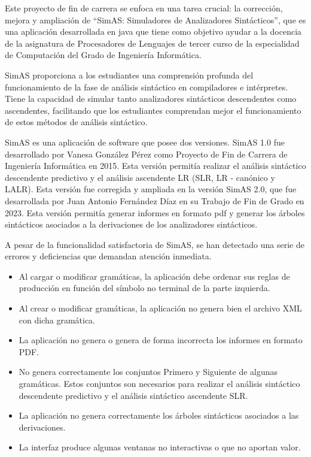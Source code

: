 Este proyecto de fin de carrera se enfoca en una tarea crucial: la corrección, mejora y ampliación de ``SimAS: Simuladores de Analizadores Sintácticos'', que es una aplicación desarrollada en java que tiene como objetivo ayudar a la docencia de la asignatura de Procesadores de Lenguajes de tercer curso de la especialidad de Computación del Grado de Ingeniería Informática. 

SimAS proporciona a los estudiantes una comprensión profunda del funcionamiento de la fase de análisis sintáctico en compiladores e intérpretes. Tiene la capacidad de simular tanto analizadores sintácticos descendentes como ascendentes, facilitando que los estudiantes comprendan mejor el funcionamiento de estos métodos de análisis sintáctico.

SimAS es una aplicación de software que posee dos versiones. SimAS 1.0 fue desarrollado por Vanesa González Pérez \cite{vanesa} como Proyecto de Fin de Carrera de Ingeniería Informática en 2015. Esta versión permitía realizar el análisis sintáctico descendente predictivo y el análisis ascendente LR (SLR, LR - canónico y LALR).  Esta versión fue corregida y ampliada en la versión SimAS 2.0, que fue desarrollada por Juan Antonio Fernández Díaz \cite{juan} en su Trabajo de Fin de Grado en 2023. Esta versión permitía generar informes en formato pdf y generar los árboles sintácticos asociados a la derivaciones de los analizadores sintácticos.


A pesar de la funcionalidad satisfactoria de SimAS, se han detectado una serie de errores y deficiencias que demandan atención inmediata.
\begin{itemize}
    \item Al cargar o modificar gramáticas, la aplicación debe ordenar sus reglas de producción en función del símbolo no terminal de la parte izquierda.
    \item Al crear o modificar gramáticas, la aplicación no genera bien el archivo XML \cite{xml} con dicha gramática.
    \item La aplicación no genera o genera de forma incorrecta los informes en formato PDF.
    \item No genera correctamente los conjuntos Primero y Siguiente de algunas gramáticas. Estos conjuntos son necesarios para realizar el análisis sintáctico descendente predictivo y el análisis sintáctico ascendente SLR.
    \item La aplicación no genera correctamente los árboles sintácticos asociados a las derivaciones.
    \item La interfaz produce algunas ventanas no interactivas o que no aportan valor.
\end{itemize}

